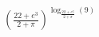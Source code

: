 \documentclass[preview]{standalone}
\begin{document}
\begin{align*}
\left( \frac{22+e{^3}}{2+\pi} \right)^{\log_{\frac{22+e{^3}}{2+\pi} }(9)}
\end{align*}
\end{document}
